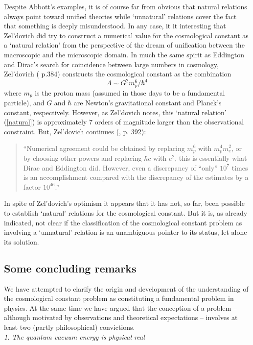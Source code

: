 \documentclass[12pt]{article}
\newcommand{\beq}{\begin{equation}}
\newcommand{\eeq}{\end{equation}}
\def\ss{\subsection}
\begin{document}
Despite Abbott's examples, it is of course far from obvious that
natural relations always point toward unified theories while
`unnatural' relations cover the fact that something is deeply
misunderstood. In any case, it it interesting that Zel'dovich 
did try to construct a numerical value for the cosmological constant
as a `natural relation' from the perspective of the dream of
unification between the macroscopic and the microscopic domain. In
much the same spirit as Eddington and Dirac's search for
coincidence between large numbers in cosmology, Zel'dovich
(\cite{zeldovich68} p.384) constructs the cosmological constant as
the combination
\beq 
\label{natural}
\Lambda \sim G^2 m_p^6/ \hbar^4
\eeq
where $m_p$ is the proton mass (assumed in those
days to be a fundamental particle), and $G$ and $\hbar$ are
Newton's gravitational constant and Planck's constant, respectively.
However, as Zel'dovich notes, this `natural relation' (\ref{natural})
is approximately 7 orders of magnitude larger than the
observational constraint. But, Zel'dovich continues (\cite{zeldovich68}, 
p. 392):
\begin{quote}
``Numerical agreement could be obtained by replacing $m_p^6$
with $m_p^4 m_e^2$, or by choosing other
powers and replacing $\hbar c$ with $e^2$, this is
essentially what Dirac and Eddington did. However, even
a discrepancy of ``only'' $10^7$ times is an accomplishment
compared with the discrepancy of the estimates by a
factor $10^{46}$.''
\end{quote}
In spite of Zel'dovich's optimism it appears that it has not, so
far, been possible to establish `natural' relations for the
cosmological constant. But it is, as already indicated, not
clear if the classification of the cosmological constant problem
as involving a `unnatural' relation is an unambiguous pointer to
its status, let alone its solution.


\ss{Some concluding remarks} 

We have attempted to clarify the origin and development of the
understanding of the cosmological constant problem as constituting a
fundamental problem in physics. At the same time we have argued that
the conception of a problem -- although motivated by observations and
theoretical expectations -- involves at least two (partly
philosophical) convictions.\\

\noindent
{\em 1. The quantum vacuum energy is physical real}
\end{document}
